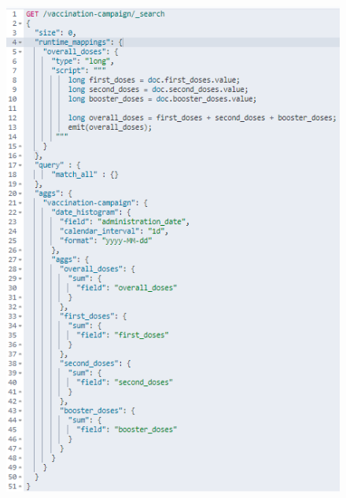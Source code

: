 \documentclass{article}[IEEEtran]
\begin{document}
\begin{figure}[H]
\begin{center}
\begin{minipage}[b]{0.4\textwidth}
    \includegraphics[width=\textwidth, frame]{Query_1.PNG}
    \subcaption{}
  \end{minipage}
  \hfill
  \begin{minipage}[b]{0.4\textwidth}

\end{minipage}
\end{center}
\end{figure}
\end{document}
